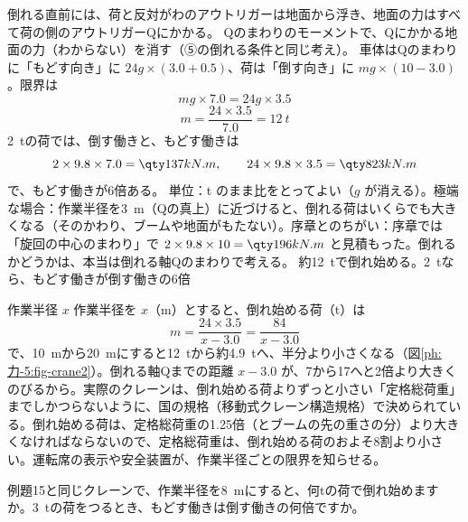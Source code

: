 \begin{phreidai}[クレーンは何トンまでつり上げられる？]
倒れる直前には、荷と反対がわのアウトリガーは地面から浮き、地面の力はすべて荷の側のアウトリガーQにかかる。
\phriyu
Qのまわりのモーメントで、Qにかかる地面の力（わからない）を消す（⑤の倒れる条件と同じ考え）。
\phtateru
車体はQのまわりに「もどす向き」に $24g\times(3.0+0.5)$、荷は「倒す向き」に $mg\times(10-3.0)$。限界は
\[ mg\times7.0=24g\times3.5 \]
\phtoku
\[ m=\frac{24\times3.5}{7.0}=\qty{12}{t} \]
\qty{2}{t}の荷では、倒す働きと、もどす働きは
\[ 2\times9.8\times7.0=\pxfkNm{137},\qquad 24\times9.8\times3.5=\pxfkNm{823} \]
で、もどす働きが6倍ある。
\phtashikame
単位：t のまま比をとってよい（$g$ が消える）。\quad 極端な場合：作業半径を\qty{3}{m}（Qの真上）に近づけると、倒れる荷はいくらでも大きくなる（そのかわり、ブームや地面がもたない）。\quad 序章とのちがい：序章では「旋回の中心のまわり」で $2\times9.8\times10=\pxfkNm{196}$ と見積もった。倒れるかどうかは、本当は倒れる軸Qのまわりで考える。
\kotae 約\qty{12}{t}で倒れ始める。\qty{2}{t}なら、もどす働きが倒す働きの6倍
\end{phreidai}
\begin{phbaisuru}{作業半径 $x$}
作業半径を $x$（m）とすると、倒れ始める荷（t）は
\[ m=\frac{24\times3.5}{x-3.0}=\frac{84}{x-3.0} \]
で、\qty{10}{m}から\qty{20}{m}にすると\qty{12}{t}から約\qty{4.9}{t}へ、半分より小さくなる（図\ref{ph:力-5:fig-crane2}）。倒れる軸Qまでの距離 $x-3.0$ が、7から17へと2倍より大きくのびるから。実際のクレーンは、倒れ始める荷よりずっと小さい「定格総荷重」までしかつらないように、国の規格（移動式クレーン構造規格）で決められている。倒れ始める荷は、定格総荷重の1.25倍（とブームの先の重さの分）より大きくなければならないので、定格総荷重は、倒れ始める荷のおよそ8割より小さい。運転席の表示や安全装置が、作業半径ごとの限界を知らせる。
\par\vspace{2pt}
\centering
{}
\label{ph:力-5:fig-crane2}
\end{phbaisuru}
\begin{jibun}
例題15と同じクレーンで、作業半径を\qty{8}{m}にすると、何tの荷で倒れ始めますか。\qty{3}{t}の荷をつるとき、もどす働きは倒す働きの何倍ですか。
\end{jibun}

